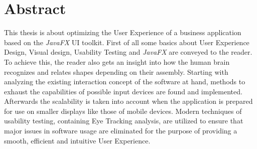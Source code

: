 \thispagestyle{empty}
\section*{Abstract}
This thesis is about optimizing the User Experience of a business application based on the \textit{JavaFX} UI toolkit. First of all some basics about User Experience Design, Visual design, Usability Testing and \textit{JavaFX} are conveyed to the reader. To achieve this, the reader also gets an insight into how the human brain recognizes and relates shapes depending on their assembly. Starting with analyzing the existing interaction concept of the software at hand, methods to exhaust the capabilities of possible input devices are found and implemented. Afterwards the scalability is taken into account when the application is prepared for use on smaller displays like those of mobile devices. Modern techniques of usability testing, containing Eye Tracking analysis, are utilized to ensure that major issues in software usage are eliminated for the purpose of providing a smooth, efficient and intuitive User Experience.